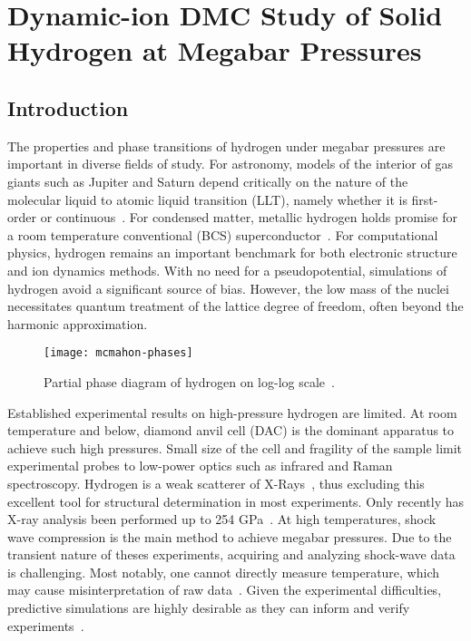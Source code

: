 \chapter{Dynamic-ion DMC Study of Solid Hydrogen at Megabar Pressures}
\label{chap:hsolid}
\section{Introduction}

The properties and phase transitions of hydrogen under megabar pressures are important in diverse fields of study. For astronomy, models of the interior of gas giants such as Jupiter and Saturn depend critically on the nature of the molecular liquid to atomic liquid transition (LLT), namely whether it is first-order or continuous~\cite{Hubbard2016,Wahl2017}. For condensed matter, metallic hydrogen holds promise for a room temperature conventional (BCS) superconductor~\cite{McMahon2011,McMahon2012}. For computational physics, hydrogen remains an important benchmark for both electronic structure~\cite{Motta2017} and ion dynamics methods. With no need for a pseudopotential, simulations of hydrogen avoid a significant source of bias. However, the low mass of the nuclei necessitates quantum treatment of the lattice degree of freedom, often beyond the harmonic approximation.

\begin{figure}[h]
\centering
\texttt{[image: mcmahon-phases]}
\caption{Partial phase diagram of hydrogen on log-log scale~\cite{McMahon2012rmp}.}
\end{figure}

Established experimental results on high-pressure hydrogen are limited. At room temperature and below, diamond anvil cell (DAC) is the dominant apparatus to achieve such high pressures. Small size of the cell and fragility of the sample limit experimental probes to low-power optics such as infrared and Raman spectroscopy\cite{RangaI.F.2017}. Hydrogen is a weak scatterer of X-Rays~\cite{Zha2014}, thus excluding this excellent tool for structural determination in most experiments. Only recently has X-ray analysis been performed up to 254 GPa~\cite{Akahama2010,Ji2019}.
At high temperatures, shock wave compression is the main method to achieve megabar pressures. Due to the transient nature of theses experiments, acquiring and analyzing shock-wave data is challenging. Most notably, one cannot directly measure temperature, which may cause misinterpretation of raw data~\cite{Celliers2018,Knudson2004,Knudson2017}.
Given the experimental difficulties, predictive simulations are highly desirable as they can inform and verify experiments~\cite{Pierleoni2016b}.

